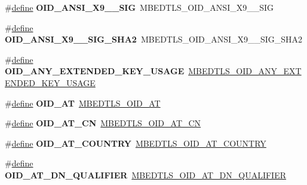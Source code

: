 \begin{DoxyCompactItemize}
\item 
\mbox{\label{compat-1_83_8h_aea8b56afb4558ec3ca16314af8defe81}} 
\#\hyperlink{structdefine}{define} {\bfseries O\+I\+D\+\_\+\+A\+N\+S\+I\+\_\+\+X9\+\_\+\_\+\+S\+IG}~M\+B\+E\+D\+T\+L\+S\+\_\+\+O\+I\+D\+\_\+\+A\+N\+S\+I\+\_\+\+X9\+\_\+\_\+\+S\+IG
\item 
\mbox{\label{compat-1_83_8h_a74f5704470ad0b9af6c9a4bb102cf01e}} 
\#\hyperlink{structdefine}{define} {\bfseries O\+I\+D\+\_\+\+A\+N\+S\+I\+\_\+\+X9\+\_\+\_\+\+S\+I\+G\+\_\+\+S\+H\+A2}~M\+B\+E\+D\+T\+L\+S\+\_\+\+O\+I\+D\+\_\+\+A\+N\+S\+I\+\_\+\+X9\+\_\+\_\+\+S\+I\+G\+\_\+\+S\+H\+A2
\item 
\mbox{\label{compat-1_83_8h_aa782cdcc5b462cfbf093f08e782fbb00}} 
\#\hyperlink{structdefine}{define} {\bfseries O\+I\+D\+\_\+\+A\+N\+Y\+\_\+\+E\+X\+T\+E\+N\+D\+E\+D\+\_\+\+K\+E\+Y\+\_\+\+U\+S\+A\+GE}~\hyperlink{oid_8h_a61da0671b3897e73edf219d44e45b693}{M\+B\+E\+D\+T\+L\+S\+\_\+\+O\+I\+D\+\_\+\+A\+N\+Y\+\_\+\+E\+X\+T\+E\+N\+D\+E\+D\+\_\+\+K\+E\+Y\+\_\+\+U\+S\+A\+GE}
\item 
\mbox{\label{compat-1_83_8h_a042dbed8c4890074dfbd9ebc353dd501}} 
\#\hyperlink{structdefine}{define} {\bfseries O\+I\+D\+\_\+\+AT}~\hyperlink{oid_8h_add867a815d56c71f8728a343c57bd963}{M\+B\+E\+D\+T\+L\+S\+\_\+\+O\+I\+D\+\_\+\+AT}
\item 
\mbox{\label{compat-1_83_8h_a5c2207a76142b3c4e5ef1986d8c39a9c}} 
\#\hyperlink{structdefine}{define} {\bfseries O\+I\+D\+\_\+\+A\+T\+\_\+\+CN}~\hyperlink{oid_8h_aed77a0ed6d223075b9fb1f346368cf89}{M\+B\+E\+D\+T\+L\+S\+\_\+\+O\+I\+D\+\_\+\+A\+T\+\_\+\+CN}
\item 
\mbox{\label{compat-1_83_8h_a4e9577d2d99a1268e9a7c3a89b4b9311}} 
\#\hyperlink{structdefine}{define} {\bfseries O\+I\+D\+\_\+\+A\+T\+\_\+\+C\+O\+U\+N\+T\+RY}~\hyperlink{oid_8h_aa0a40910c92769782568fba1aa197310}{M\+B\+E\+D\+T\+L\+S\+\_\+\+O\+I\+D\+\_\+\+A\+T\+\_\+\+C\+O\+U\+N\+T\+RY}
\item 
\mbox{\label{compat-1_83_8h_ac1fa277f1dfc9d47afa372922660ab09}} 
\#\hyperlink{structdefine}{define} {\bfseries O\+I\+D\+\_\+\+A\+T\+\_\+\+D\+N\+\_\+\+Q\+U\+A\+L\+I\+F\+I\+ER}~\hyperlink{oid_8h_a2d1401e6d2a88766988d39926a3e3c5b}{M\+B\+E\+D\+T\+L\+S\+\_\+\+O\+I\+D\+\_\+\+A\+T\+\_\+\+D\+N\+\_\+\+Q\+U\+A\+L\+I\+F\+I\+ER}

\end{DoxyCompactItemize}
